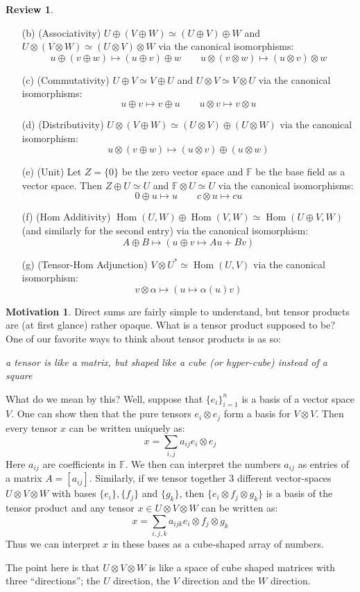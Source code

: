 \documentclass[12pt]{article}
\theoremstyle{definition}
\newtheorem{review}[theorem]{Review}
\newtheorem{motivation}[theorem]{Motivation}
\numberwithin{equation}{section}
\newcommand{\op}{\operatorname}
\begin{document}
\begin{review}
\begin{itemize}
	\item[(b)] (Associativity) $U \oplus (V \oplus W) \simeq (U \oplus V) \oplus W$ and $U \otimes (V \otimes W) \simeq (U \otimes V) \otimes W$ via the canonical isomorphisms:
	\[u \oplus (v \oplus w) \mapsto (u \oplus v) \oplus w \qquad u \otimes (v \otimes w) \mapsto (u \otimes v) \otimes w\]
	\item[(c)] (Commutativity) $U \oplus V \simeq V \oplus U$ and $U \otimes V \simeq V \otimes U$ via the canonical isomorphisms:
	\[ u \oplus v \mapsto v \oplus u \qquad u \otimes v \mapsto v \otimes u\]
	\item[(d)] (Distributivity) $U \otimes (V \oplus W) \simeq (U \otimes V) \oplus (U \otimes W)$ via the canonical isomorphism:
	\[u \otimes (v \oplus w) \mapsto (u \otimes v) \oplus (u \otimes w)
	\]
	\item[(e)] (Unit) Let $Z = \{0\}$ be the zero vector space and $\mathbb{F}$ be the base field as a vector space. Then $Z \oplus U \simeq U$ and $\mathbb{F} \otimes U \simeq U$ via the canonical isomorphisms:
	\[
	0 \oplus u \mapsto u \qquad c \otimes u \mapsto cu
	\]
	\item[(f)] (Hom Additivity) $\op{Hom}(U,W) \oplus \op{Hom}(V,W) \simeq \op{Hom}(U \oplus V,W)$ (and similarly for the second entry) via the canonical isomorphism:
	\[
	A \oplus B \mapsto (u \oplus v \mapsto Au + Bv)
	\]
	\item[(g)] (Tensor-Hom Adjunction) $V \otimes U^* \simeq \op{Hom}(U,V)$ via the canonical isomorphism:
	\[
	v \otimes \alpha \mapsto (u \mapsto \alpha(u) v)
	\]
\end{itemize}
\end{review}

\begin{motivation} Direct sums are fairly simple to understand, but tensor products are (at first glance) rather opaque. What is a tensor product supposed to be? One of our favorite ways to think about tensor products is as so:
\begin{center}
\emph{a tensor is like a matrix, but shaped like a cube (or hyper-cube) instead of a square}
\end{center}
What do we mean by this? Well, suppose that $\{e_i\}_{i=1}^n$ is a basis of a vector space $V$. One can show then that the pure tensors $e_i \otimes e_j$ form a basis for $V \otimes V$. Then every tensor $x$ can be written uniquely as:
\[
x = \sum_{i,j} a_{ij} e_i \otimes e_j
\]
Here $a_{ij}$ are coefficients in $\mathbb{F}$. We then can interpret the numbers $a_{ij}$ as entries of a matrix $A = [a_{ij}]$. Similarly, if we tensor together 3 different vector-spaces $U \otimes V \otimes W$ with bases $\{e_i\}, \{f_j\}$ and $\{g_k\}$, then $\{e_i \otimes f_j \otimes g_k\}$ is a basis of the tensor product and any tensor $x \in U \otimes V \otimes W$ can be written as:
\[
x = \sum_{i,j,k} a_{ijk} e_i \otimes f_j \otimes g_k
\]
Thus we can interpret $x$ in these bases as a cube-shaped array of numbers. 

The point here is that $U \otimes V \otimes W$ is like a space of cube shaped matrices with three ``directions''; the $U$ direction, the $V$ direction and the $W$ direction.
\end{motivation} 
\end{document}
